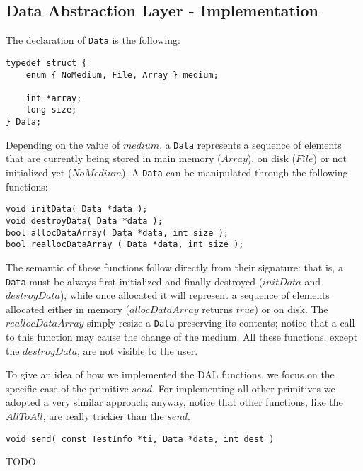 \subsection*{Data Abstraction Layer - Implementation}
The declaration of \texttt{Data} is the following:
\begin{lstlisting}
typedef struct {
	enum { NoMedium, File, Array } medium;

	int *array;
	long size;
} Data;
\end{lstlisting}
Depending on the value of $medium$, a \texttt{Data} represents a sequence of elements that are currently being stored in main memory ($Array$), on disk ($File$) or not initialized yet ($NoMedium$). A \texttt{Data} can be manipulated through the following functions: 
\begin{lstlisting}
void initData( Data *data );
void destroyData( Data *data );
bool allocDataArray( Data *data, int size );
bool reallocDataArray ( Data *data, int size );
\end{lstlisting}
The semantic of these functions follow directly from their signature: that is, a \texttt{Data} must be always first initialized and finally destroyed ($initData$ and $destroyData$), while once allocated it will represent a sequence of elements allocated either in memory ($allocDataArray$ returns $true$) or on disk. The $reallocDataArray$ simply resize a \texttt{Data} preserving its contents; notice that a call to this function may cause the change of the medium. All these functions, except the $destroyData$, are not visible to the user.

To give an idea of how we implemented the DAL functions, we focus on the specific case of the primitive $send$. For implementing all other primitives we adopted a very similar approach; anyway, notice that other functions, like the $AllToAll$, are really trickier than the $send$. 
\begin{lstlisting}
void send( const TestInfo *ti, Data *data, int dest )
\end{lstlisting}
TODO


